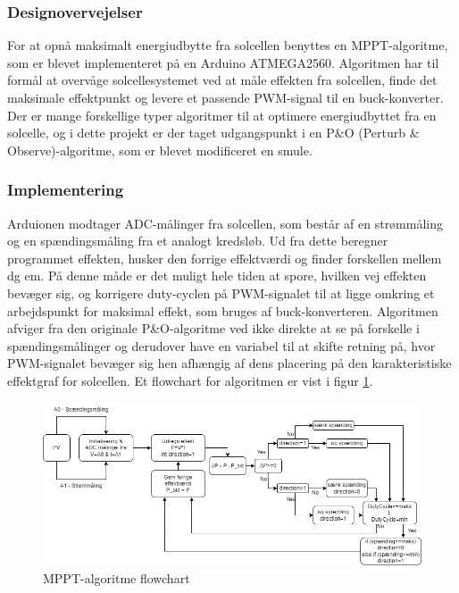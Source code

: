 \documentclass[../main.tex]{subfiles}
\begin{document}
    \subsubsection{Designovervejelser}

    For at opnå maksimalt energiudbytte fra solcellen benyttes en MPPT-algoritme, som er blevet implementeret på en Arduino ATMEGA2560. Algoritmen har til formål at overvåge solcellesystemet ved at måle effekten fra solcellen, finde det maksimale effektpunkt og levere et passende PWM-signal til en buck-konverter. Der er mange forskellige typer algoritmer til at optimere energiudbyttet fra en solcelle, og i dette projekt er der taget udgangspunkt i en P&O (Perturb & Observe)-algoritme, som er blevet modificeret en smule.

    \subsubsection{Implementering}

    Arduionen modtager ADC-målinger fra solcellen, som består af en strømmåling og en spændingsmåling fra et analogt kredsløb. Ud fra dette beregner programmet effekten, husker den forrige effektværdi og finder forskellen mellem dg em. På denne måde er det muligt hele tiden at spore, hvilken vej effekten bevæger sig, og korrigere duty-cyclen på PWM-signalet til at ligge omkring et arbejdspunkt for maksimal effekt, som bruges af buck-konverteren. Algoritmen afviger fra den originale P&O-algoritme ved ikke direkte at se på forskelle i spændingsmålinger og derudover have en variabel til at skifte retning på, hvor PWM-signalet bevæger sig hen afhængig af dens placering på den karakteristiske effektgraf for solcellen. Et flowchart for algoritmen er vist i figur \ref{fig: MPPT Flowchart}.
        
    \begin{figure}[H]
      \includegraphics[width=\textwidth]{Dokumentation/mpptflowchart.drawio (1).png}
     \caption{MPPT-algoritme flowchart}
     \label{fig: MPPT Flowchart}
     \end{figure}
    
\end{document}

